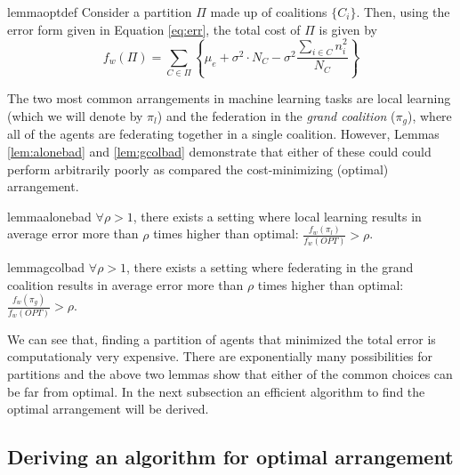 \documentclass{article}
\newcommand{\cb}[1]{\left\{ #1 \right\}}
\newcommand{\cd}[0]{\cdot}
\newcommand{\mue}[0]{\ensuremath{\mu_e}}
\newcommand{\var}[0]{\ensuremath{\sigma^2}}
\newcommand{\ndraw}[0]{\ensuremath{n}}
\newcommand{\total}[0]{\ensuremath{N}}
\newcommand{\alone}[0]{\ensuremath{\pi_l}}
\newcommand{\gcol}[0]{\ensuremath{\pi_g}}
\newcommand{\col}[0]{\ensuremath{C}}
\newcommand{\costw}[0]{\ensuremath{f_w}}
\newcommand{\partition}[0]{\ensuremath{\Pi}}
\begin{document}
\begin{restatable}{lemma}{optdef}
\label{lem:optdef}
Consider a partition $\partition$ made up of coalitions $\{\col_i\}$. Then, using the error form given in Equation \ref{eq:err}, the total cost of $\partition$ is given by
$$\costw(\partition) = \sum_{\col \in \partition}\cb{\mue + \var \cd \total_{\col} - \var \frac{\sum_{i \in \col} \ndraw_i^2}{\total_{\col}}}$$
\end{restatable}


The two most common arrangements in machine learning tasks are local learning (which we will denote by $\alone$) and the federation in the \emph{grand coalition} ($\gcol$), where all of the agents are federating together in a single coalition. However, Lemmas \ref{lem:alonebad} and \ref{lem:gcolbad} demonstrate that either of these could could perform arbitrarily poorly as compared the cost-minimizing (optimal) arrangement.

\begin{restatable}{lemma}{alonebad}
\label{lem:alonebad}
$\forall \rho>1$, there exists a setting where local learning results in average error more than $\rho$ times higher than optimal: $\frac{\costw(\alone)}{\costw(OPT)} > \rho$. 
\end{restatable}


\begin{restatable}{lemma}{gcolbad}
\label{lem:gcolbad}
$\forall \rho > 1$, there exists a setting where federating in the grand coalition results in average error more than $\rho$ times higher than optimal: $\frac{\costw(\gcol)}{\costw(OPT)} > \rho$. 
\end{restatable}

We can see that, finding a partition of agents that minimized the total error is computationaly very expensive. There are exponentially many possibilities for partitions and the above two lemmas show that either of the common choices can be far from optimal. In the next subsection an efficient algorithm to find the optimal arrangement will be derived.

\subsection{Deriving an algorithm for optimal arrangement}
\end{document}
